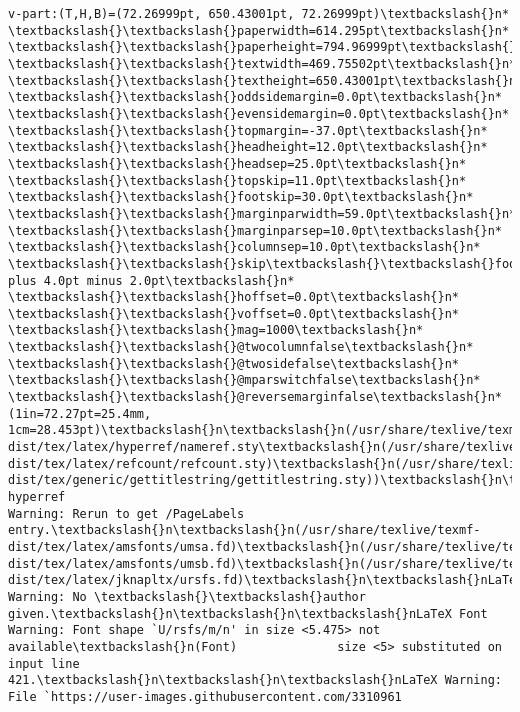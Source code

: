 \documentclass[11pt]{article}
\begin{document}
\begin{Verbatim}[commandchars=\\\{\}]
v-part:(T,H,B)=(72.26999pt, 650.43001pt, 72.26999pt)\textbackslash{}n*
\textbackslash{}\textbackslash{}paperwidth=614.295pt\textbackslash{}n* \textbackslash{}\textbackslash{}paperheight=794.96999pt\textbackslash{}n*
\textbackslash{}\textbackslash{}textwidth=469.75502pt\textbackslash{}n* \textbackslash{}\textbackslash{}textheight=650.43001pt\textbackslash{}n* \textbackslash{}\textbackslash{}oddsidemargin=0.0pt\textbackslash{}n*
\textbackslash{}\textbackslash{}evensidemargin=0.0pt\textbackslash{}n* \textbackslash{}\textbackslash{}topmargin=-37.0pt\textbackslash{}n* \textbackslash{}\textbackslash{}headheight=12.0pt\textbackslash{}n*
\textbackslash{}\textbackslash{}headsep=25.0pt\textbackslash{}n* \textbackslash{}\textbackslash{}topskip=11.0pt\textbackslash{}n* \textbackslash{}\textbackslash{}footskip=30.0pt\textbackslash{}n*
\textbackslash{}\textbackslash{}marginparwidth=59.0pt\textbackslash{}n* \textbackslash{}\textbackslash{}marginparsep=10.0pt\textbackslash{}n* \textbackslash{}\textbackslash{}columnsep=10.0pt\textbackslash{}n*
\textbackslash{}\textbackslash{}skip\textbackslash{}\textbackslash{}footins=10.0pt plus 4.0pt minus 2.0pt\textbackslash{}n* \textbackslash{}\textbackslash{}hoffset=0.0pt\textbackslash{}n*
\textbackslash{}\textbackslash{}voffset=0.0pt\textbackslash{}n* \textbackslash{}\textbackslash{}mag=1000\textbackslash{}n* \textbackslash{}\textbackslash{}@twocolumnfalse\textbackslash{}n* \textbackslash{}\textbackslash{}@twosidefalse\textbackslash{}n*
\textbackslash{}\textbackslash{}@mparswitchfalse\textbackslash{}n* \textbackslash{}\textbackslash{}@reversemarginfalse\textbackslash{}n* (1in=72.27pt=25.4mm,
1cm=28.453pt)\textbackslash{}n\textbackslash{}n(/usr/share/texlive/texmf-
dist/tex/latex/hyperref/nameref.sty\textbackslash{}n(/usr/share/texlive/texmf-
dist/tex/latex/refcount/refcount.sty)\textbackslash{}n(/usr/share/texlive/texmf-
dist/tex/generic/gettitlestring/gettitlestring.sty))\textbackslash{}n\textbackslash{}nPackage hyperref
Warning: Rerun to get /PageLabels entry.\textbackslash{}n\textbackslash{}n(/usr/share/texlive/texmf-
dist/tex/latex/amsfonts/umsa.fd)\textbackslash{}n(/usr/share/texlive/texmf-
dist/tex/latex/amsfonts/umsb.fd)\textbackslash{}n(/usr/share/texlive/texmf-
dist/tex/latex/jknapltx/ursfs.fd)\textbackslash{}n\textbackslash{}nLaTeX Warning: No \textbackslash{}\textbackslash{}author
given.\textbackslash{}n\textbackslash{}n\textbackslash{}nLaTeX Font Warning: Font shape `U/rsfs/m/n' in size <5.475> not
available\textbackslash{}n(Font)              size <5> substituted on input line
421.\textbackslash{}n\textbackslash{}n\textbackslash{}nLaTeX Warning: File `https://user-images.githubusercontent.com/3310961

\end{Verbatim}
\end{document}
